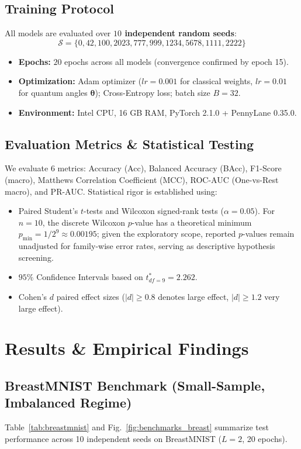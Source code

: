 \documentclass[runningheads]{llncs}
\begin{document}
\subsection{Training Protocol}
All models are evaluated over \textbf{$10$ independent random seeds}:
\begin{equation*}
\mathcal{S} = \{0, 42, 100, 2023, 777, 999, 1234, 5678, 1111, 2222\}
\end{equation*}
\begin{itemize}
    \item \textbf{Epochs:} $20$ epochs across all models (convergence confirmed by epoch 15).
    \item \textbf{Optimization:} Adam optimizer ($lr = 0.001$ for classical weights, $lr = 0.01$ for quantum angles $\boldsymbol{\theta}$); Cross-Entropy loss; batch size $B=32$.
    \item \textbf{Environment:} Intel CPU, 16 GB RAM, PyTorch 2.1.0 + PennyLane 0.35.0.
\end{itemize}

\subsection{Evaluation Metrics \& Statistical Testing}
We evaluate $6$ metrics: Accuracy (Acc), Balanced Accuracy (BAcc), F1-Score (macro), Matthews Correlation Coefficient (MCC), ROC-AUC (One-vs-Rest macro), and PR-AUC. Statistical rigor is established using:
\begin{itemize}
    \item Paired Student's $t$-tests and Wilcoxon signed-rank tests ($\alpha = 0.05$). For $n=10$, the discrete Wilcoxon $p$-value has a theoretical minimum $p_{\min} = 1/2^9 \approx 0.00195$; given the exploratory scope, reported $p$-values remain unadjusted for family-wise error rates, serving as descriptive hypothesis screening.
    \item $95\%$ Confidence Intervals based on $t_{df=9}^* = 2.262$.
    \item Cohen's $d$ paired effect sizes ($|d| \ge 0.8$ denotes large effect, $|d| \ge 1.2$ very large effect).
\end{itemize}

\section{Results \& Empirical Findings}

\subsection{BreastMNIST Benchmark (Small-Sample, Imbalanced Regime)}
Table~\ref{tab:breastmnist} and Fig.~\ref{fig:benchmarks_breast} summarize test performance across 10 independent seeds on BreastMNIST ($L=2$, 20 epochs).
\end{document}
